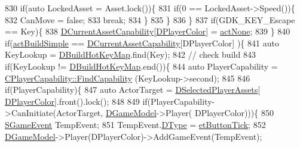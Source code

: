 \begin{DoxyCode}
830                 \textcolor{keywordflow}{if}(\textcolor{keyword}{auto} LockedAsset = Asset.lock())\{
831                     \textcolor{keywordflow}{if}(0 == LockedAsset->Speed())\{
832                         CanMove = \textcolor{keyword}{false};
833                         \textcolor{keywordflow}{break};
834                     \}
835                 \}
836             \}
837             \textcolor{keywordflow}{if}(GDK\_KEY\_Escape == Key)\{
838                 \hyperlink{classCApplicationData_a7e0dbfdc54f73dfa9838ae81b8017e2d}{DCurrentAssetCapability}[\hyperlink{classCApplicationData_a53550939b20cba70570f113e4d1c5d02}{DPlayerColor}] = 
      \hyperlink{GameDataTypes_8h_a35b98ce26aca678b03c6f9f76e4778ceaa8df154ad276f6f62054e9b5b0696f92}{actNone};   
839             \}
840             \textcolor{keywordflow}{if}(\hyperlink{GameDataTypes_8h_a35b98ce26aca678b03c6f9f76e4778ceacab8a5395c24e2bf1c9778a0066a3237}{actBuildSimple} == \hyperlink{classCApplicationData_a7e0dbfdc54f73dfa9838ae81b8017e2d}{DCurrentAssetCapability}[DPlayerColor]
      )\{
841                 \textcolor{keyword}{auto} KeyLookup = \hyperlink{classCApplicationData_accd0e5b0bf28b34b8cce8148eb13de31}{DBuildHotKeyMap}.find(Key);
842                 \textcolor{comment}{// check build}
843                 \textcolor{keywordflow}{if}(KeyLookup != \hyperlink{classCApplicationData_accd0e5b0bf28b34b8cce8148eb13de31}{DBuildHotKeyMap}.end())\{
844                     \textcolor{keyword}{auto} PlayerCapability = \hyperlink{classCPlayerCapability_a881ba4b87385d7cfe5cb6ced2d26f226}{CPlayerCapability::FindCapability}
      (KeyLookup->second); 
845             
846                     \textcolor{keywordflow}{if}(PlayerCapability)\{
847                         \textcolor{keyword}{auto} ActorTarget = \hyperlink{classCApplicationData_a05c1087d5a5c4ddc14fcb37444f1642b}{DSelectedPlayerAssets}[
      \hyperlink{classCApplicationData_a53550939b20cba70570f113e4d1c5d02}{DPlayerColor}].front().lock();
848                         
849                         \textcolor{keywordflow}{if}(PlayerCapability->CanInitiate(ActorTarget, \hyperlink{classCApplicationData_a32b50c7c1cbac3cfd67c7f775b1d6fee}{DGameModel}->Player(
      DPlayerColor)))\{
850                             \hyperlink{structSGameEvent}{SGameEvent} TempEvent;
851                             TempEvent.\hyperlink{structSGameEvent_afa10562e243f4ac2b473b655cc58fee7}{DType} = \hyperlink{GameModel_8h_abfcf510bafec7c6429906a6ecaac656dafe7284f9af34794514e5dbfe974e3296}{etButtonTick};
852                             \hyperlink{classCApplicationData_a32b50c7c1cbac3cfd67c7f775b1d6fee}{DGameModel}->Player(DPlayerColor)->AddGameEvent(TempEvent);

\end{DoxyCode}
